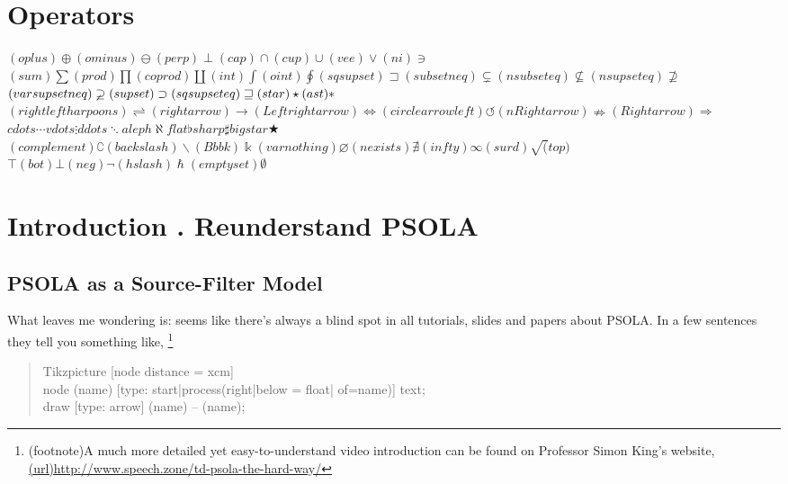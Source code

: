 \documentclass[11pt]{article}
\begin{document}
\section{Operators}

$(oplus)\oplus (ominus)\ominus (perp)\perp (cap)\cap (cup)\cup (vee)\vee (ni)\ni$ \\
$(sum)\sum (prod)\prod (coprod)\coprod (int)\int (oint)\oint (sqsupset)\sqsupset (subsetneq)\subsetneq (nsubseteq)\nsubseteq (nsupseteq)\nsupseteq$ \\
$(varsupsetneq)\varsupsetneq (supset)\supset (sqsupseteq)\sqsupseteq (star)\star (ast)\ast$ \\
$(rightleftharpoons)\rightleftharpoons (rightarrow)\rightarrow (Leftrightarrow)\Leftrightarrow (circlearrowleft)\circlearrowleft (nRightarrow) \nRightarrow (Rightarrow)\Rightarrow$ \\
$cdots \cdots vdots \vdots ddots \ddots aleph \aleph flat \flat sharp \sharp bigstar \bigstar$ \\
$(complement)\complement (backslash)\backslash (Bbbk)\Bbbk (varnothing)\varnothing (nexists)\nexists (infty)\infty (surd)\surd (top)$ \\
$\top (bot)\bot (neg)\neg (hslash)\hslash (emptyset)\emptyset$

\section{Introduction . Reunderstand PSOLA}

\subsection{PSOLA as a Source-Filter Model}

What leaves me wondering is: seems like there's always a blind spot in all tutorials, slides and papers about PSOLA. In a few sentences they tell you something like,
\footnote{(footnote)A much more detailed yet easy-to-understand video introduction can be found on Professor Simon King's website, \url{(url)http://www.speech.zone/td-psola-the-hard-way/}}

\begin{quotation}
Tikzpicture [node distance = xcm] \\
node (name) [type: start|process(right|below = float| of=name)] {text}; \\
draw [type: arrow] (name) -- (name);
\end{quotation}
\end{document}
